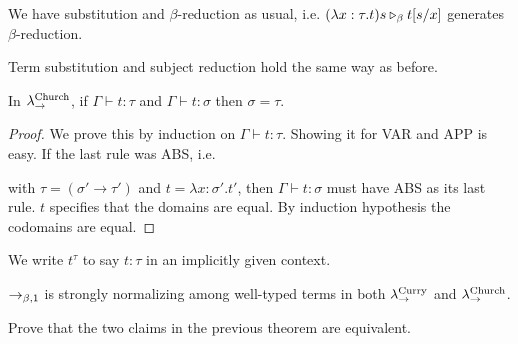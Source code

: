 \begin{rem}
    We have substitution and $\beta$-reduction as usual, i.e. $(\lambda x : \tau . t)s \becont t[s/x]$ generates $\beta$-reduction.
\end{rem}

\begin{rem}
    Term substitution and subject reduction hold the same way as before.
\end{rem}

\begin{boxprop}
    In $\lamchu$, if $\Gamma \vdash t : \tau$ and $\Gamma \vdash t : \sigma$ then $\sigma = \tau$.
\end{boxprop}
\begin{proof}
    We prove this by induction on $\Gamma \vdash t : \tau$.
    Showing it for VAR and APP is easy.
    If the last rule was ABS, i.e.
    \begin{prooftree}
    \end{prooftree}
    with $\tau = (\sigma' \to \tau')$ and $t = \lambda x : \sigma'. t'$,
    then $\Gamma \vdash t : \sigma$ must have ABS as its last rule.
    $t$ specifies that the domains are equal.
    By induction hypothesis the codomains are equal.
\end{proof}

\begin{rem}
    We write $t^\tau$ to say $t : \tau$ in an implicitly given context.
\end{rem}

\begin{boxthm}
    $\beored$ is strongly normalizing among well-typed terms in both $\lamcur$ and $\lamchu$.
\end{boxthm}

\begin{exercise}
    Prove that the two claims in the previous theorem are equivalent.
\end{exercise}

